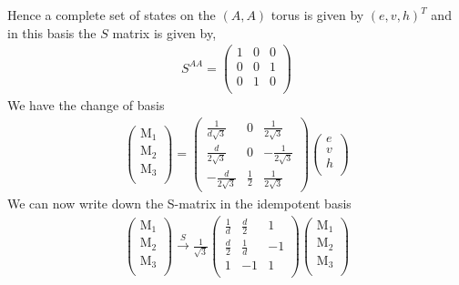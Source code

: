 \documentclass[12pt,a4paper]{article}
\newcounter{arrow}
\begin{document}
Hence a complete set of states on the $(A,A)$ torus is given by $(e, v, h)^{T}$ and in this basis the $S$ matrix is given by,
\begin{align}
S^{AA} = \left(\begin{matrix}
1& 0& 0 \\
0& 0&1  \\
0&1 &0 \\ 
\end{matrix} \right)
\end{align}
We have the change of basis
\begin{align}
\left( \begin{matrix}
\text{M}_1\\
\text{M}_2\\
\text{M}_3\\
\end{matrix} \right)
= \left( \begin{matrix}
\frac{1}{d\sqrt{3}} & 0 & \frac{1}{2 \sqrt{3}} \\
\frac{d}{2 \sqrt{3}} & 0 & - \frac{1}{2 \sqrt{3}} \\
- \frac{d}{2 \sqrt{3}} & \frac{1}{2} & \frac{1}{2 \sqrt{3}}
\end{matrix} \right)
\left( \begin{matrix}
e\\
v\\
h\\
\end{matrix} \right)
\end{align}
We can now write down the S-matrix in the idempotent basis
\begin{align}
\left( \begin{matrix}
\text{M}_1\\
\text{M}_2\\
\text{M}_3\\
\end{matrix} \right) \xrightarrow{S} 
\frac{1}{\sqrt{3}}\left( \begin{matrix}
\frac{1}{d} & \frac{d}{2} & 1\\ 
\frac{d}{2} & \frac{1}{d} & -1\\
1 & -1 & 1\\
\end{matrix} \right)
\left( \begin{matrix}
\text{M}_1\\
\text{M}_2\\
\text{M}_3\\
\end{matrix} \right)
\end{align}
\end{document}
